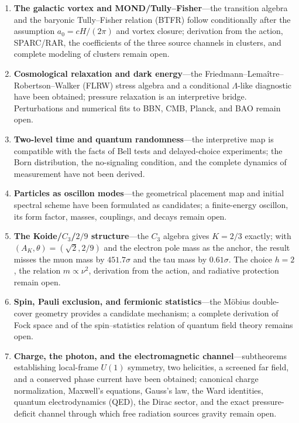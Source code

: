 \documentclass[11pt,a4paper]{article}
\begin{document}
\begin{enumerate}
\item \textbf{The galactic vortex and MOND/Tully--Fisher}---the transition algebra and the baryonic Tully--Fisher relation (BTFR) follow conditionally after the assumption $a_0=cH/(2\pi)$ and vortex closure; derivation from the action, SPARC/RAR, the coefficients of the three source channels in clusters, and complete modeling of clusters remain open.

\item \textbf{Cosmological relaxation and dark energy}---the Friedmann--Lemaître--Robertson--Walker (FLRW) stress algebra and a conditional $\Lambda$-like diagnostic have been obtained; pressure relaxation is an interpretive bridge. Perturbations and numerical fits to BBN, CMB, Planck, and BAO remain open.

\item \textbf{Two-level time and quantum randomness}---the interpretive map is compatible with the facts of Bell tests and delayed-choice experiments; the Born distribution, the no-signaling condition, and the complete dynamics of measurement have not been derived.

\item \textbf{Particles as oscillon modes}---the geometrical placement map and initial spectral scheme have been formulated as candidates; a finite-energy oscillon, its form factor, masses, couplings, and decays remain open.

\item \textbf{The Koide/$C_3$/$2/9$ structure}---the $C_3$ algebra gives $K=2/3$ exactly; with $(A_K,\theta)=(\sqrt2,2/9)$ and the electron pole mass as the anchor, the result misses the muon mass by $451.7\sigma$ and the tau mass by $0.61\sigma$. The choice $h=2$, the relation $m\propto\nu^2$, derivation from the action, and radiative protection remain open.

\item \textbf{Spin, Pauli exclusion, and fermionic statistics}---the Möbius double-cover geometry provides a candidate mechanism; a complete derivation of Fock space and of the spin--statistics relation of quantum field theory remains open.

\item \textbf{Charge, the photon, and the electromagnetic channel}---subtheorems establishing local-frame $U(1)$ symmetry, two helicities, a screened far field, and a conserved phase current have been obtained; canonical charge normalization, Maxwell's equations, Gauss's law, the Ward identities, quantum electrodynamics (QED), the Dirac sector, and the exact pressure-deficit channel through which free radiation sources gravity remain open.


\end{enumerate}
\end{document}
